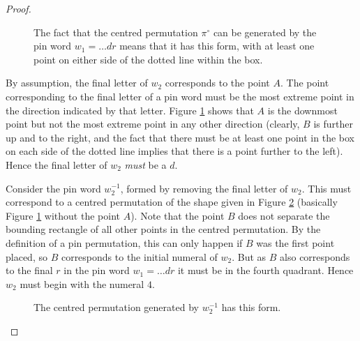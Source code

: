 \documentclass[11pt,a4paper]{article}
\newcommand{\plotptradius}{4pt}
\theoremstyle{definition}
\begin{document}
\begin{proof}
\begin{figure}[h]
\begin{center}
\end{center}
\caption{The fact that the centred permutation $\pi^{\circ}$ can be generated by the pin word $w_{1}=\dots dr$ means that it has this form, with at least one point on either side of the dotted line within the box.}
\label{ii}
\end{figure}


By assumption, the final letter of $w_{2}$ corresponds to the point $A$. The point corresponding to the final letter of a pin word must be the most extreme point in the direction indicated by that letter. Figure \ref{ii} shows that $A$ is the downmost point but not the most extreme point in any other direction (clearly, $B$ is further up and to the right, and the fact that there must be at least one point in the box on each side of the dotted line implies that there is a point further to the left). Hence the final letter of $w_{2}$ \emph{must} be a $d$.

Consider the pin word $w_{2}^{-1}$, formed by removing the final letter of $w_{2}$. This must correspond to a centred permutation of the shape given in Figure \ref{iii} (basically Figure \ref{ii} without the point $A$). Note that the point $B$ does not separate the bounding rectangle of all other points in the centred permutation. By the definition of a pin permutation, this can only happen if $B$ was the first point placed, so $B$ corresponds to the initial numeral of $w_{2}$. But as $B$ also corresponds to the final $r$ in the pin word $w_{1} = \dots dr$ it must be in the fourth quadrant. Hence $w_{2}$ must begin with the numeral $4$.

\begin{figure}[h]
\begin{center}
\end{center}
\caption{The centred permutation generated by $w_{2}^{-1}$ has this form.}
\label{iii}
\end{figure}


\end{proof}
\end{document}
